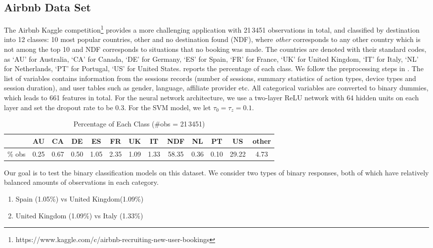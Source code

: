 \documentclass[ba]{imsart}
\numberwithin{equation}{section}
\theoremstyle{plain}
\begin{document}
\subsection{Airbnb Data Set}
 The Airbnb Kaggle competition\footnote{https://www.kaggle.com/c/airbnb-recruiting-new-user-bookings} provides a more challenging application with  21\,3451 observations in total, and classified by destination into 12 classes: 10 most popular countries, other and  no destination found (NDF), where \textit{other} corresponds to any other country which is not among the top 10 and NDF corresponds to situations that no booking was made.   The countries are denoted with their standard codes, as `AU' for Australia, `CA' for Canada, `DE' for Germany, `ES' for Spain, `FR' for France, `UK' for United Kingdom, `IT' for Italy, `NL' for Netherlands, `PT' for Portugal, `US' for United States.  reports the percentage of each class. We follow the preprocessing steps in \citet{polson2017deep}. The list of variables contains information from the sessions records (number of sessions, summary statistics of action types, device types and session duration), and user tables such as gender, language, affiliate provider etc. All categorical variables are converted to binary dummies, which leads to 661 features in total. For the neural network architecture, we use a two-layer ReLU network with 64 hidden units on each layer and set the dropout rate to be 0.3. For the SVM model, we let $\tau_0=\tau_z=0.1$.
 

\begin{table}[!ht]
\footnotesize
\centering
\begin{tabular}{l | *{12}{c} }
\toprule
 & AU& CA & DE & ES& FR& UK &IT& NDF& NL& PT& US& other \\
\midrule
\% obs &  0.25 &  0.67 &  0.50 & 1.05 & 2.35 & 1.09 & 1.33 & 58.35 & 0.36 & 
 0.10 & 29.22 &  4.73 \\
\bottomrule
\end{tabular}
\caption{Percentage of Each Class (\#obs = 21\,3451)}\label{tab:dest}
\end{table}

Our goal is to  test the  binary classification models on this dataset.  We consider two types of binary responses, both of which have relatively balanced amounts of observations in each category.
\begin{enumerate}
\vspace{-0.1in}
\item Spain (1.05\%) vs United Kingdom(1.09\%) 
\item United Kingdom (1.09\%) vs Italy (1.33\%)
\vspace{-0.1in}
\end{enumerate}
\end{document}
